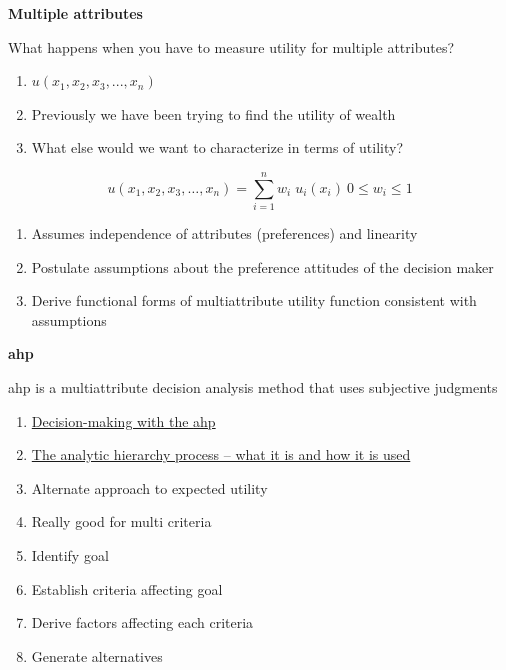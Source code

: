 \documentclass[aspectratio=1610,pdftex,dvipsnames,compress,xcolor={dvipsnames}]{beamer}
\newcommand{\acf}{\acrfull} %
\newcommand{\acs}{\acrshort} %
\begin{document}
\begin{frame}[plain]{}
    \centering\LARGE\textbf{Multiple attributes}
\end{frame}


\addtocounter{framenumber}{-1}
\begin{frame}{What happens when you have to measure utility for multiple attributes?}
    \begin{enumerate}[series=outerlist,topsep=0pt,itemsep=7pt,leftmargin=*,label=(\arabic*)]
        \item[]$u(x_1,x_2,x_3,...,x_n)$
        \item[]Previously we have been trying to find the utility of wealth  
        \item[]What else would we want to characterize in terms of utility?
    \end{enumerate}

    \begin{equation}
        u(x_1,x_2,x_3, \ldots ,x_n) = \sum_{i=1}^n w_i \; u_i(x_i) \: 0 \leq w_i \leq 1
    \end{equation}

    \begin{enumerate}[series=outerlist,topsep=0pt,itemsep=11pt,leftmargin=*,label=(\arabic*)]
        \item[]Assumes independence of attributes (preferences) and linearity 
        \item[]Postulate assumptions about the preference attitudes of the decision maker
        \item[]Derive functional forms of multiattribute utility function consistent with assumptions
    \end{enumerate}
\end{frame}


\begin{frame}[plain]{}
    \centering\LARGE\textbf{\acf{ahp}}
\end{frame}


\addtocounter{framenumber}{-1}
\begin{frame}{\acs{ahp} is a multiattribute decision analysis method that uses subjective judgments}
    \begin{enumerate}[series=outerlist,topsep=0pt,itemsep=13pt,leftmargin=*,label=(\arabic*)]
        \item[]\href{https://www.stat.uchicago.edu/~lekheng/meetings/mathofranking/ref/saaty1.pdf}{Decision-making with the \acs{ahp}}
        \item[]\href{https://www.sciencedirect.com/science/article/pii/0270025587904738}{The analytic hierarchy process -- what it is and how it is used}
        \item[]Alternate approach to expected utility 
        \item[]Really good for multi criteria
        \item[]Identify goal  
        \item[]Establish criteria affecting goal  
        \item[]Derive factors affecting each criteria  
        \item[]Generate alternatives
    \end{enumerate}
\end{frame}
\end{document}
